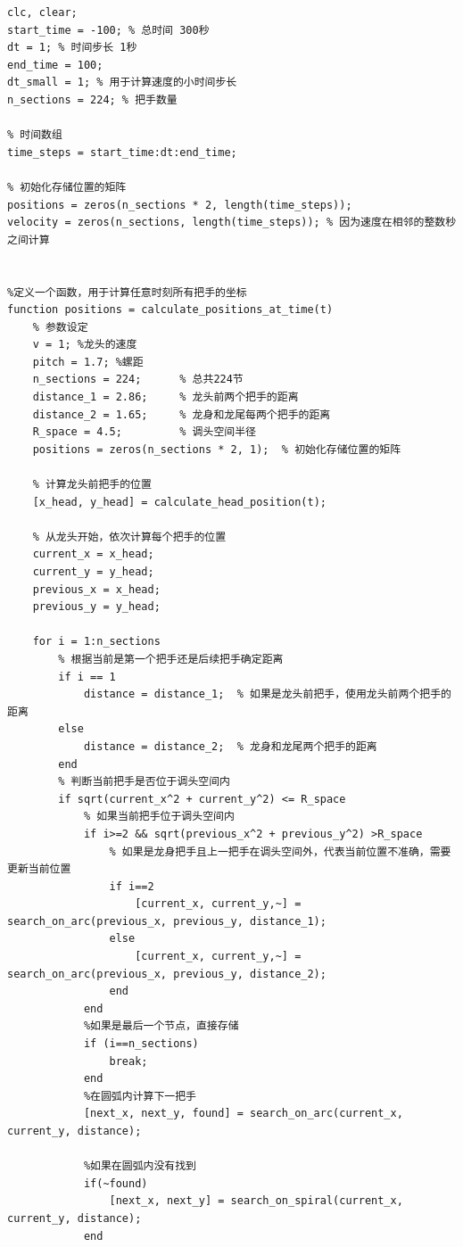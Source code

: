 \documentclass{cumcmthesis1}
\begin{document}
\begin{lstlisting}[caption={求解问题4中-100s到100s位置和速度的代码，并将计算结果保存到result4.xlsx中}, label={lst:eighth_code}]
clc, clear;
start_time = -100; % 总时间 300秒
dt = 1; % 时间步长 1秒
end_time = 100;
dt_small = 1; % 用于计算速度的小时间步长
n_sections = 224; % 把手数量

% 时间数组
time_steps = start_time:dt:end_time;

% 初始化存储位置的矩阵
positions = zeros(n_sections * 2, length(time_steps)); 
velocity = zeros(n_sections, length(time_steps)); % 因为速度在相邻的整数秒之间计算


%定义一个函数，用于计算任意时刻所有把手的坐标
function positions = calculate_positions_at_time(t)
    % 参数设定
    v = 1; %龙头的速度
    pitch = 1.7; %螺距
    n_sections = 224;      % 总共224节
    distance_1 = 2.86;     % 龙头前两个把手的距离
    distance_2 = 1.65;     % 龙身和龙尾每两个把手的距离
    R_space = 4.5;         % 调头空间半径
    positions = zeros(n_sections * 2, 1);  % 初始化存储位置的矩阵
    
    % 计算龙头前把手的位置
    [x_head, y_head] = calculate_head_position(t);

    % 从龙头开始，依次计算每个把手的位置
    current_x = x_head;
    current_y = y_head;
    previous_x = x_head;
    previous_y = y_head;

    for i = 1:n_sections
        % 根据当前是第一个把手还是后续把手确定距离
        if i == 1
            distance = distance_1;  % 如果是龙头前把手，使用龙头前两个把手的距离
        else
            distance = distance_2;  % 龙身和龙尾两个把手的距离
        end
        % 判断当前把手是否位于调头空间内
        if sqrt(current_x^2 + current_y^2) <= R_space
            % 如果当前把手位于调头空间内
            if i>=2 && sqrt(previous_x^2 + previous_y^2) >R_space
                % 如果是龙身把手且上一把手在调头空间外，代表当前位置不准确，需要更新当前位置
                if i==2
                    [current_x, current_y,~] = search_on_arc(previous_x, previous_y, distance_1);
                else
                    [current_x, current_y,~] = search_on_arc(previous_x, previous_y, distance_2);
                end
            end
            %如果是最后一个节点，直接存储
            if (i==n_sections)
                break;
            end
            %在圆弧内计算下一把手
            [next_x, next_y, found] = search_on_arc(current_x, current_y, distance);

            %如果在圆弧内没有找到
            if(~found)
                [next_x, next_y] = search_on_spiral(current_x, current_y, distance);
            end


\end{lstlisting}
\end{document}
